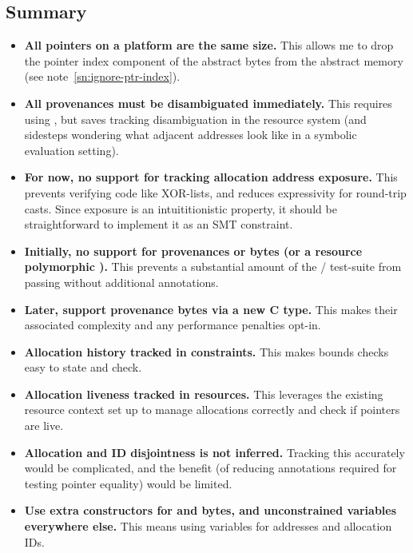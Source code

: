 \subsection{Summary}

\begin{itemize}
    \item \textbf{All pointers on a platform are the same size.} This
        allows me to drop the pointer index component of the abstract bytes
        from the abstract memory (see note~\ref{sn:ignore-ptr-index}).
    \item \textbf{All provenances must be disambiguated immediately.} This
        requires using , but saves tracking
        disambiguation in the resource system (and sidesteps wondering what
        adjacent addresses look like in a symbolic evaluation setting).
    \item \textbf{For now, no support for tracking allocation address
        exposure.} This prevents verifying code like XOR-lists, and reduces
        expressivity for round-trip casts. Since exposure is an
        intuititionistic property, it should be straightforward to
        implement it as an SMT constraint.
    \item \textbf{Initially, no support for provenances or bytes
        (or a resource polymorphic ).}
        This prevents a substantial amount of the /
        test-suite from passing without additional annotations.
    \item \textbf{Later, support provenance bytes via a new C type.} This makes
        their associated complexity and any performance penalties opt-in.
    \item \textbf{Allocation history tracked in constraints.} This makes
        bounds checks easy to state and check.
    \item \textbf{Allocation liveness tracked in resources.} This leverages the
        existing resource context set up to manage allocations correctly and
        check if pointers are live.
    \item \textbf{Allocation and ID disjointness is not inferred.} Tracking
        this accurately would be complicated, and the benefit (of reducing
        annotations required for testing pointer equality) would be limited.
    \item \textbf{Use extra constructors for  and
         bytes, and unconstrained variables everywhere
        else.} This means using variables for addresses and allocation IDs.
\end{itemize}
